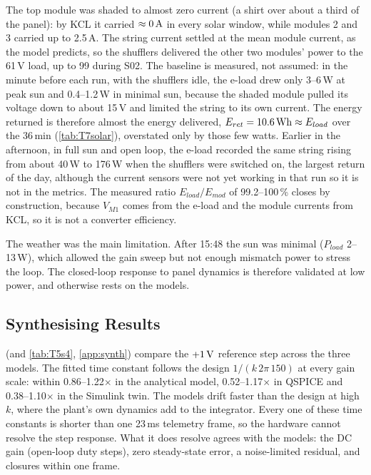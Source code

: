 The top module was shaded to almost zero current (a shirt over about a third of the panel): by KCL it carried $\approx 0\,\mathrm{A}$ in every solar window, while modules 2 and 3 carried up to 2.5\,A. The string current settled at the mean module current, as the model predicts, so the shufflers delivered the other two modules' power to the 61\,V load, up to 99\W{} during S02. The baseline is measured, not assumed: in the minute before each run, with the shufflers idle, the e-load drew only 3--6\,W at peak sun and 0.4--1.2\,W in minimal sun, because the shaded module pulled its voltage down to about 15\,V and limited the string to its own current. The energy returned is therefore almost the energy delivered, $E_{ret} = 10.6\,\mathrm{Wh} \approx E_{load}$ over the 36\,min (\cref{tab:T7solar}), overstated only by those few watts. Earlier in the afternoon, in full sun and open loop, the e-load recorded the same string rising from about 40\,W to 176\,W when the shufflers were switched on, the largest return of the day, although the current sensors were not yet working in that run so it is not in the metrics. The measured ratio $E_{load}/E_{mod}$ of 99.2--100\,\% closes by construction, because $V_{M1}$ comes from the e-load and the module currents from KCL, so it is not a converter efficiency.

The weather was the main limitation. After 15:48 the sun was minimal ($P_{load}$ 2--13\,W), which allowed the gain sweep but not enough mismatch power to stress the loop. The closed-loop response to panel dynamics is therefore validated at low power, and otherwise rests on the models.

\subsection{Synthesising Results}
\label{sec:synthesis}
 (and \cref{tab:T5s4}, \cref{app:synth}) compare the $+1\,\mathrm{V}$ reference step across the three models. The fitted time constant follows the design $1/(k\,2\pi\,150)$ at every gain scale: within 0.86--1.22$\times$ in the analytical model, 0.52--1.17$\times$ in QSPICE and 0.38--1.10$\times$ in the Simulink twin. The models drift faster than the design at high $k$, where the plant's own dynamics add to the integrator. Every one of these time constants is shorter than one 23\,ms telemetry frame, so the hardware cannot resolve the step response. What it does resolve agrees with the models: the DC gain (open-loop duty steps), zero steady-state error, a noise-limited residual, and closures within one frame.

